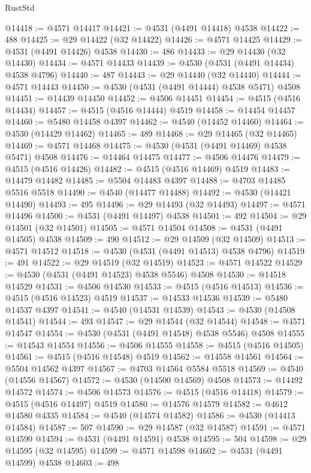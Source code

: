 \begin{lexlean}{RustStd}
\begin{coremodule}
@14418 := @4571 @14417
@14421 := @4531 (@4491 @14418) @4538
@14422 := 488
@14425 := @29 @14422 (@32 @14422)
@14426 := @4571 @14425
@14429 := @4531 (@4491 @14426) @4538
@14430 := 486
@14433 := @29 @14430 (@32 @14430)
@14434 := @4571 @14433
@14439 := @4530 (@4531 (@4491 @14434) @4538 @4796)
@14440 := 487
@14443 := @29 @14440 (@32 @14440)
@14444 := @4571 @14443
@14450 := @4530 (@4531 (@4491 @14444) @4538 @5471) @4508
@14451 := @14439 @14450
@14452 := @4506 @14451
@14454 := @4515 (@4516 @14434)
@14457 := @4515 (@4516 @14444) @4519
@14458 := @14454 @14457
@14460 := @5480 @14458 @4397
@14462 := @4540 (@14452 @14460)
@14464 := @4530 (@14429 @14462)
@14465 := 489
@14468 := @29 @14465 (@32 @14465)
@14469 := @4571 @14468
@14475 := @4530 (@4531 (@4491 @14469) @4538 @5471) @4508
@14476 := @14464 @14475
@14477 := @4506 @14476
@14479 := @4515 (@4516 @14426)
@14482 := @4515 (@4516 @14469) @4519
@14483 := @14479 @14482
@14485 := @5504 @14483 @4397
@14488 := @4703 @14485 @5516 @5518
@14490 := @4540 (@14477 @14488)
@14492 := @4530 (@14421 @14490)
@14493 := 495
@14496 := @29 @14493 (@32 @14493)
@14497 := @4571 @14496
@14500 := @4531 (@4491 @14497) @4538
@14501 := 492
@14504 := @29 @14501 (@32 @14501)
@14505 := @4571 @14504
@14508 := @4531 (@4491 @14505) @4538
@14509 := 490
@14512 := @29 @14509 (@32 @14509)
@14513 := @4571 @14512
@14518 := @4530 (@4531 (@4491 @14513) @4538 @4796)
@14519 := 491
@14522 := @29 @14519 (@32 @14519)
@14523 := @4571 @14522
@14529 := @4530 (@4531 (@4491 @14523) @4538 @5546) @4508
@14530 := @14518 @14529
@14531 := @4506 @14530
@14533 := @4515 (@4516 @14513)
@14536 := @4515 (@4516 @14523) @4519
@14537 := @14533 @14536
@14539 := @5480 @14537 @4397
@14541 := @4540 (@14531 @14539)
@14543 := @4530 (@14508 @14541)
@14544 := 493
@14547 := @29 @14544 (@32 @14544)
@14548 := @4571 @14547
@14554 := @4530 (@4531 (@4491 @14548) @4538 @5546) @4508
@14555 := @14543 @14554
@14556 := @4506 @14555
@14558 := @4515 (@4516 @14505)
@14561 := @4515 (@4516 @14548) @4519
@14562 := @14558 @14561
@14564 := @5504 @14562 @4397
@14567 := @4703 @14564 @5584 @5518
@14569 := @4540 (@14556 @14567)
@14572 := @4530 (@14500 @14569) @4508
@14573 := @14492 @14572
@14574 := @4506 @14573
@14576 := @4515 (@4516 @14418)
@14579 := @4515 (@4516 @14497) @4519
@14580 := @14576 @14579
@14582 := @4612 @14580 @4335
@14584 := @4540 (@14574 @14582)
@14586 := @4530 (@14413 @14584)
@14587 := 507
@14590 := @29 @14587 (@32 @14587)
@14591 := @4571 @14590
@14594 := @4531 (@4491 @14591) @4538
@14595 := 504
@14598 := @29 @14595 (@32 @14595)
@14599 := @4571 @14598
@14602 := @4531 (@4491 @14599) @4538
@14603 := 498

\end{coremodule}
\end{lexlean}
